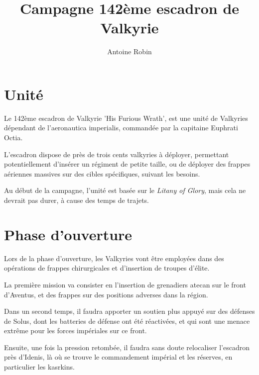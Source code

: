 \documentclass[10pt,a4paper]{book}
\author{ Antoine Robin}
\title{Campagne 142ème escadron de Valkyrie}
\begin{document}
\maketitle
\chapter{Unité}
Le 142ème escadron de Valkyrie 'His Furious Wrath', est une unité de Valkyries dépendant de l'aeronautica imperialis, commandée par la capitaine Euphrati Octia.

L'escadron dispose de près de trois cents valkyries à déployer, permettant potentiellement d'insérer un régiment de petite taille, ou de déployer des frappes aériennes massives sur des cibles spécifiques, suivant les besoins.

Au début de la campagne, l'unité est basée sur le \emph{Litany of Glory}, mais cela ne devrait pas durer, à cause des temps de trajets.
\chapter{Phase d'ouverture}
Lors de la phase d'ouverture, les Valkyries vont être employées dans des opérations de frappes chirurgicales et d'insertion de troupes d'élite.

La première mission va consister en l'insertion de grenadiers atecan sur le front d'Aventus, et des frappes sur des positions adverses dans la région.

Dans un second temps, il faudra apporter un soutien plus appuyé sur des défenses de Solus, dont les batteries de défense ont été réactivées, et qui sont une menace extrême pour les forces impériales sur ce front.

Ensuite, une fois la pression retombée, il faudra sans doute relocaliser l'escadron près d'Idenis, là où se trouve le commandement impérial et les réserves, en particulier les kasrkins.
\end{document}
